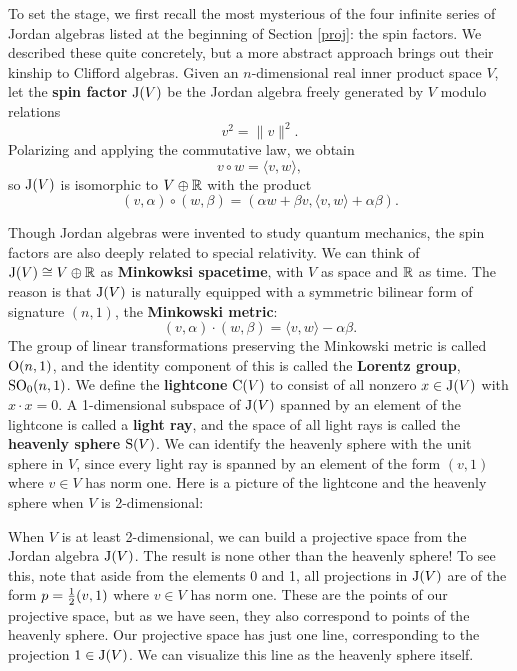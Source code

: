 To set the stage, we first recall the most mysterious of the four 
infinite series of Jordan algebras listed at the beginning of Section 
\ref{proj}: the spin factors.  We described these quite concretely, but 
a more abstract approach brings out their kinship to Clifford algebras.  
Given an $n$-dimensional real inner product space $V$, let the {\bf spin 
factor} ${\rm J}(V)$ be the Jordan algebra freely generated by $V$ modulo
relations  
\[     v^2 = \|v\|^2  .\]  
Polarizing and applying the commutative law, we obtain   
\[   v\circ w = \langle v, w \rangle, \]  
so ${\rm J}(V)$ is isomorphic to $V \oplus {\mathbb R}$ with the product  
\[  (v,\alpha) \circ (w, \beta) =   
(\alpha w + \beta v, \langle v,w\rangle + \alpha \beta). \] 
 
Though Jordan algebras were invented to study quantum mechanics, the 
spin factors are also deeply related to special relativity.  We can 
think of ${\rm J}(V) \cong V \oplus {\mathbb R}$ as {\bf Minkowksi spacetime}, with 
$V$ as space and ${\mathbb R}$ as time.  The reason is that ${\rm J}(V)$ is naturally
equipped with a symmetric bilinear form of signature $(n,1)$, the {\bf
Minkowski metric}: 
\[    (v,\alpha)\cdot (w,\beta) = \langle v,w\rangle - \alpha \beta. \] 
The group of linear transformations preserving the Minkowski metric is 
called ${\rm O}(n,1)$, and the identity component of this is called the {\bf 
Lorentz group}, ${\rm SO}_0(n,1)$.   We define the {\bf lightcone} ${\rm 
C}(V)$ to consist of all nonzero $x \in {\rm J}(V)$ with $x \cdot x = 0$.  A 
1-dimensional subspace of ${\rm J}(V)$ spanned by an element of the 
lightcone is called a {\bf light ray}, and the space of all light rays is 
called the {\bf heavenly sphere} ${\rm S}(V)$.  We can identify the 
heavenly sphere with the unit sphere in $V$, since every light ray is 
spanned by an element of the form $(v,1)$ where $v \in V$ has norm one. 
Here is a picture of the lightcone and the heavenly sphere when $V$ is 
2-dimensional: 
 
\medskip 
\centerline{\epsfysize=1.5in}   
\label{heavenly}   
\medskip 
 
When $V$ is at least 2-dimensional, we can build a projective space from 
the Jordan algebra ${\rm J}(V)$.  The result is none other than the heavenly 
sphere!   To see this, note that aside from the elements 0 and 1, all 
projections in ${\rm J}(V)$ are of the form $p = \textstyle{1\over 2}(v, 1)$ 
where $v \in V$ has norm one.  These are the points of our projective 
space, but as we have seen, they also correspond to points of the 
heavenly sphere.  Our projective space has just one line, corresponding 
to the projection $1 \in {\rm J}(V)$.  We can visualize this line as the 
heavenly sphere itself.  
 
